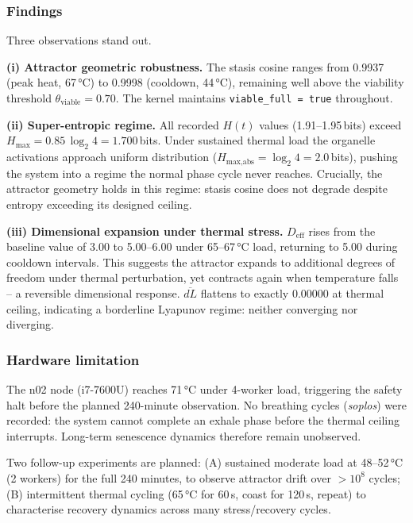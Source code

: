\documentclass[11pt, a4paper]{article}
\begin{document}
\subsubsection*{Findings}

Three observations stand out.

\textbf{(i) Attractor geometric robustness.}
The stasis cosine ranges from 0.9937 (peak heat, 67\,°C) to 0.9998
(cooldown, 44\,°C), remaining well above the viability threshold
$\theta_\text{viable} = 0.70$.
The kernel maintains \texttt{viable\_full = true} throughout.

\textbf{(ii) Super-entropic regime.}
All recorded $H(t)$ values (1.91--1.95\,bits) exceed
$H_\text{max} = 0.85\,\log_2 4 = 1.700$\,bits.
Under sustained thermal load the organelle activations approach uniform
distribution ($H_\text{max,abs} = \log_2 4 = 2.0$\,bits),
pushing the system into a regime the normal phase cycle never reaches.
Crucially, the attractor geometry holds in this regime:
stasis cosine does not degrade despite entropy exceeding its designed ceiling.

\textbf{(iii) Dimensional expansion under thermal stress.}
$D_\text{eff}$ rises from the baseline value of 3.00 to 5.00--6.00
under 65--67\,°C load, returning to 5.00 during cooldown intervals.
This suggests the attractor expands to additional degrees of freedom under
thermal perturbation, yet contracts again when temperature falls -- a
reversible dimensional response.
$\overline{dL}$ flattens to exactly 0.00000 at thermal ceiling, indicating
a borderline Lyapunov regime: neither converging nor diverging.

\subsubsection*{Hardware limitation}

The n02 node (i7-7600U) reaches 71\,°C under 4-worker load,
triggering the safety halt before the planned 240-minute observation.
No breathing cycles (\textit{soplos}) were recorded: the system cannot
complete an exhale phase before the thermal ceiling interrupts.
Long-term senescence dynamics therefore remain unobserved.

Two follow-up experiments are planned:
(A) sustained moderate load at 48--52\,°C (2 workers) for the full 240 minutes,
to observe attractor drift over $>10^8$ cycles;
(B) intermittent thermal cycling (65\,°C for 60\,s, coast for 120\,s, repeat)
to characterise recovery dynamics across many stress/recovery cycles.
\end{document}
